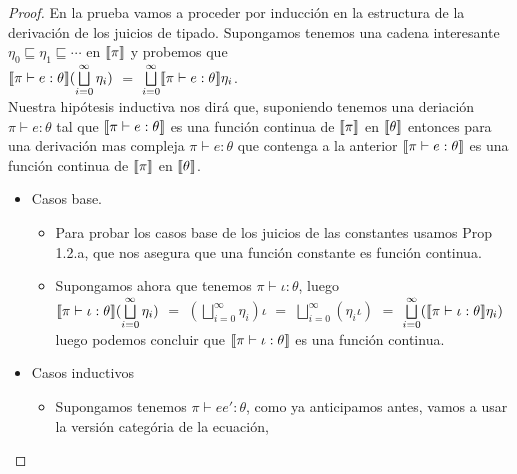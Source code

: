 \begin{proof}

En la prueba vamos a proceder por inducci\'on en la estructura de la derivaci\'on 
de los juicios de tipado. Supongamos tenemos una cadena interesante
$\eta_0 \sqsubseteq \eta_1 \sqsubseteq \cdots$ en $\llbracket \pi \rrbracket$ y probemos
que\\

$\llbracket \pi \vdash e : \theta \rrbracket(\bigsqcup\limits^{\infty}_{i=0} \eta_i)$
$=$ $\bigsqcup\limits^{\infty}_{i=0} \llbracket \pi \vdash e : \theta \rrbracket\eta_i$.\\

Nuestra hip\'otesis inductiva nos dir\'a que, suponiendo
tenemos una deriaci\'on $\pi \vdash e : \theta$ tal que
$\llbracket \pi \vdash e : \theta \rrbracket$ es una funci\'on continua 
de $\llbracket \pi \rrbracket$ en $\llbracket \theta \rrbracket$ entonces para
una derivaci\'on mas compleja $\pi \vdash e : \theta$ que
contenga a la anterior $\llbracket \pi \vdash e : \theta \rrbracket$ es 
una funci\'on continua de $\llbracket \pi \rrbracket$ en $\llbracket \theta \rrbracket$.\\

\begin{itemize}
\item Casos base.

\begin{itemize}
\item Para probar los casos base de los juicios de las constantes usamos Prop 1.2.a, 
que nos asegura que una funci\'on constante es funci\'on continua. 

\item Supongamos ahora que tenemos $\pi \vdash \iota : \theta$, luego \\

$\llbracket \pi \vdash \iota : \theta \rrbracket (\bigsqcup\limits^{\infty}_{i=0} \eta_i)$ $=$
$(\bigsqcup\limits^{\infty}_{i=0} \eta_i)\iota$ $=$
$\bigsqcup\limits^{\infty}_{i=0} (\eta_i \iota)$ $=$
$\bigsqcup\limits^{\infty}_{i=0} (\llbracket \pi \vdash \iota : \theta \rrbracket\eta_i)$\\

luego podemos concluir que $\llbracket \pi \vdash \iota : \theta \rrbracket$ es una funci\'on
continua.
\end{itemize}

\item Casos inductivos
\begin{itemize}

\item Supongamos tenemos $\pi \vdash ee' : \theta$, como ya anticipamos antes, vamos a
usar la versi\'on categ\'oria de la ecuaci\'on, \\


\end{itemize}
\end{itemize}
\end{proof}
